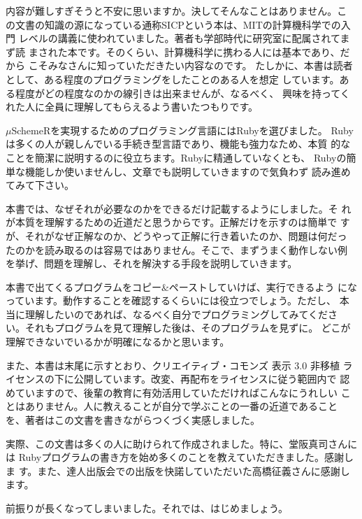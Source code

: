 内容が難しすぎそうと不安に思いますか。決してそんなことはありません。こ
の文書の知識の源になっている通称SICPという本は、MITの計算機科学での入門
レベルの講義に使われていました。著者も学部時代に研究室に配属されてまず読
まされた本です。そのくらい、計算機科学に携わる人には基本であり、だから
こそみなさんに知っていただきたい内容なのです。
たしかに、本書は読者として、ある程度のプログラミングをしたことのある人を想定
しています。ある程度がどの程度なのかの線引きは出来ませんが、なるべく、
興味を持ってくれた人に全員に理解してもらえるよう書いたつもりです。

$\mu$SchemeRを実現するためのプログラミング言語にはRubyを選びました。
Rubyは多くの人が親しんでいる手続き型言語であり、機能も強力なため、本質
的なことを簡潔に説明するのに役立ちます。Rubyに精通していなくとも、
Rubyの簡単な機能しか使いませんし、文章でも説明していきますので気負わず
読み進めてみて下さい。

本書では、なぜそれが必要なのかをできるだけ記載するようにしました。そ
れが本質を理解するための近道だと思うからです。正解だけを示すのは簡単で
すが、それがなぜ正解なのか、どうやって正解に行き着いたのか、問題は何だっ
たのかを読み取るのは容易ではありません。そこで、まずうまく動作しない例
を挙げ、問題を理解し、それを解決する手段を説明していきます。

本書で出てくるプログラムをコピー$\&$ペーストしていけば、実行できるよう
になっています。動作することを確認するくらいには役立つでしょう。ただし、
本当に理解したいのであれば、なるべく自分でプログラミングしてみてくださ
い。それもプログラムを見て理解した後は、そのプログラムを見ずに。
どこが理解できないでいるかが明確になるかと思います。

また、本書は末尾に示すとおり、クリエイティブ・コモンズ 表示 3.0 非移植
ライセンスの下に公開しています。改変、再配布をライセンスに従う範囲内で
認めていますので、後輩の教育に有効活用していただければこんなにうれしい
ことはありません。人に教えることが自分で学ぶことの一番の近道であること
を、著者はこの文書を書きながらつくづく実感しました。

実際、この文書は多くの人に助けられて作成されました。特に、堂阪真司さんには
Rubyプログラムの書き方を始め多くのことを教えていただきました。感謝しま
す。また、達人出版会での出版を快諾していただいた高橋征義さんに感謝します。

前振りが長くなってしまいました。それでは、はじめましょう。
